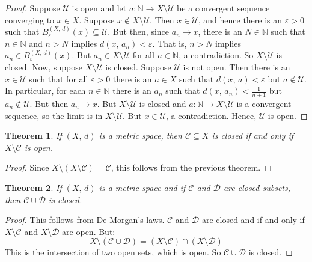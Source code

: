 \documentclass{article}
\theoremstyle{plain}
\newtheorem{theorem}{Theorem}[section]
\theoremstyle{normal}
\begin{document}
        \begin{proof}
            Suppose $\mathcal{U}$ is open and let
            $a:\mathbb{N}\rightarrow{X}\setminus\mathcal{U}$ be a convergent
            sequence converging to $x\in{X}$. Suppose
            $x\notin{X}\setminus\mathcal{U}$. Then $x\in\mathcal{U}$, and hence
            there is an $\varepsilon>0$ such that
            $B_{\varepsilon}^{(X,\,d)}(x)\subseteq\mathcal{U}$. But then,
            since $a_{n}\rightarrow{x}$, there is an $N\in\mathbb{N}$ such that
            $n\in\mathbb{N}$ and $n>N$ implies
            $d(x,\,a_{n})<\varepsilon$. That is, $n>N$ implies
            $a_{n}\in{B}_{\varepsilon}^{(X,\,d)}(x)$. But
            $a_{n}\in{X}\setminus\mathcal{U}$ for all $n\in\mathbb{N}$, a
            contradiction. So $X\setminus\mathcal{U}$ is closed. Now,
            suppose $X\setminus\mathcal{U}$ is closed. Suppose
            $\mathcal{U}$ is not open. Then there is an
            $x\in\mathcal{U}$ such that for all $\varepsilon>0$ there is an
            $a\in{X}$ such that $d(x,\,a)<\varepsilon$ but
            $a\notin\mathcal{U}$. In particular, for each
            $n\in\mathbb{N}$ there is an $a_{n}$ such that
            $d(x,\,a_{n})<\frac{1}{n+1}$ but $a_{n}\notin\mathcal{U}$.
            But then $a_{n}\rightarrow{x}$. But $X\setminus\mathcal{U}$
            is closed and $a:\mathbb{N}\rightarrow{X}\setminus\mathcal{U}$
            is a convergent sequence, so the limit is in
            $X\setminus\mathcal{U}$. But $x\in\mathcal{U}$, a contradiction.
            Hence, $\mathcal{U}$ is open.
        \end{proof}
        \begin{theorem}
            If $(X,\,d)$ is a metric space, then
            $\mathcal{C}\subseteq{X}$ is closed if and only if
            $X\setminus\mathcal{C}$ is open.
        \end{theorem}
        \begin{proof}
            Since $X\setminus(X\setminus\mathcal{C})=\mathcal{C}$,
            this follows from the previous theorem.
        \end{proof}
        \begin{theorem}
            If $(X,\,d)$ is a metric space and if $\mathcal{C}$ and
            $\mathcal{D}$ are closed subsets, then
            $\mathcal{C}\cup\mathcal{D}$ is closed.
        \end{theorem}
        \begin{proof}
            This follows from De Morgan's laws.
            $\mathcal{C}$ and $\mathcal{D}$ are closed and if and only if
            $X\setminus\mathcal{C}$ and $X\setminus\mathcal{D}$ are open.
            But:
            \begin{equation}
                X\setminus(\mathcal{C}\cup\mathcal{D})
                    =(X\setminus\mathcal{C})\cap(X\setminus\mathcal{D})
            \end{equation}
            This is the intersection of two open sets, which is open. So
            $\mathcal{C}\cup\mathcal{D}$ is closed.
        \end{proof}
\end{document}
